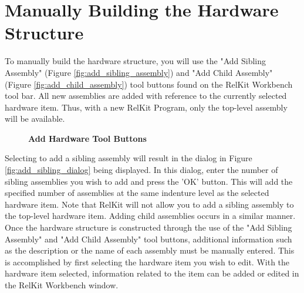 \documentclass[11pt, 12pt, twoside, onecolumn]{book}
\begin{document}
\section{Manually Building the Hardware Structure}

\noindent To manually build the hardware structure, you will use the "Add Sibling Assembly" (Figure \ref{fig:add_sibling_assembly}) and "Add Child Assembly" (Figure \ref{fig:add_child_assembly}) tool buttons found on the RelKit Workbench tool bar.  All new assemblies are added with reference to the currently selected hardware item.  Thus, with a new RelKit Program, only the top-level assembly will be available. \\

\begin{figure}[htb]
	\begin{minipage}{0.5\textwidth}
		\centering
		 \quad \quad \quad
	\end{minipage}\hfill
	\caption{\textbf{Add Hardware Tool Buttons}}
	\label{fig:add_hardware}
\end{figure}

\noindent Selecting to add a sibling assembly will result in the dialog in Figure \ref{fig:add_sibling_dialog} being displayed.  In this dialog, enter the number of sibling assemblies you wish to add and press the 'OK' button.  This will add the specified number of assemblies at the same indenture level as the selected hardware item.  Note that RelKit will not allow you to add a sibling assembly to the top-level hardware item.  Adding child assemblies occurs in a similar manner. \\

\noindent Once the hardware structure is constructed through the use of the "Add Sibling Assembly" and "Add Child Assembly" tool buttons, additional information such as the description or the name of each assembly must be manually entered.  This is accomplished by first selecting the hardware item you wish to edit.  With the hardware item selected, information related to the item can be added or edited in the RelKit Workbench window. \\
\end{document}
